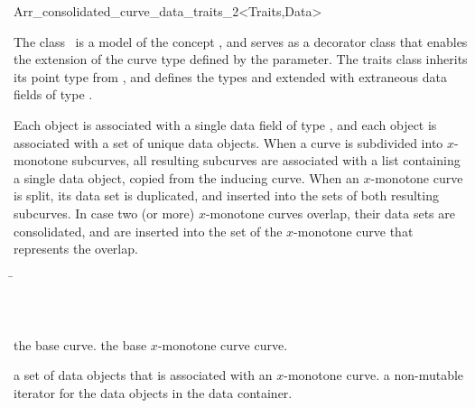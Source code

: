 
\ccRefPageBegin
\begin{ccRefClass}{Arr_consolidated_curve_data_traits_2<Traits,Data>}

\ccDefinition
The class \ccRefName\ is a model of the concept ,
and serves as a decorator class that enables the extension of the curve
type defined by the  parameter. The traits class inherits its 
point type from , and defines the types
 and  extended with extraneous data
fields of type .

Each  object is associated with a single data field of type
, and each  object is associated with 
a set of unique data objects. When a curve is subdivided into $x$-monotone
subcurves, all resulting subcurves are associated with a list containing 
a single data object, copied from the inducing curve. When an $x$-monotone 
curve is split, its data set is duplicated, and inserted into the sets of 
both resulting subcurves. In case two (or more) $x$-monotone curves 
overlap, their data sets are consolidated, and are inserted into the set
of the $x$-monotone curve that represents the overlap.

 
\ccIsModel{}

\ccInheritsFrom
\begin{tabbing}
\=\\
                              \>\\
                              \>\\
                              \>
\end{tabbing}

\ccTypes
\ccGlue
{}%
  {the base curve.}
\ccGlue
{}%
  {the base $x$-monotone curve curve.}

%
  {a set of data objects that is associated with an $x$-monotone curve.}
\ccGlue
{}%
  {a non-mutable iterator for the data objects in the data container.}


\end{ccRefClass}
